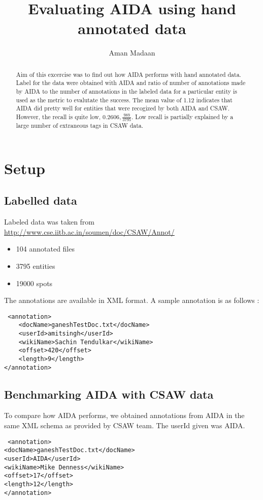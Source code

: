 \documentclass[a4paper,10pt]{article}
\title{Evaluating AIDA using hand annotated data}
\author{Aman Madaan}
\begin{document}
\maketitle

\begin{abstract}
Aim of this excercise was to find out how AIDA performs with hand annotated data. Label for the data were obtained
with AIDA and ratio of number of annotations made by AIDA to the number of annotations in the labeled data for a particular entity
is used as the metric to evalutate the success. The mean value of 1.12 indicates that AIDA did pretty well for
entities that were recogized by both AIDA and CSAW. However, the recall is quite low, $0.2606, \frac{989}{3795}$.
Low recall is partially explained by a large number of extraneous tags in CSAW data.
\end{abstract}

\section{Setup}
\subsection{Labelled data}
Labeled data was taken from \url{http://www.cse.iitb.ac.in/soumen/doc/CSAW/Annot/}
\begin{itemize}
 \item 104 annotated files
 \item 3795 entities
 \item 19000 spots 
\end{itemize}

The annotations are available in XML format. A sample annotation is as follows : 
\begin{verbatim}
 <annotation>
	<docName>ganeshTestDoc.txt</docName>
	<userId>amitsingh</userId>
	<wikiName>Sachin Tendulkar</wikiName>
	<offset>420</offset>
	<length>9</length>
</annotation>
\end{verbatim}

\subsection{Benchmarking AIDA with CSAW data}
To compare how AIDA performs, we obtained annotations from AIDA in the same XML schema as
provided by CSAW team. The userId given was AIDA.
\begin{verbatim}
 <annotation>
<docName>ganeshTestDoc.txt</docName>
<userId>AIDA</userId>
<wikiName>Mike Denness</wikiName>
<offset>17</offset>
<length>12</length>
</annotation>
\end{verbatim}
\end{document}
